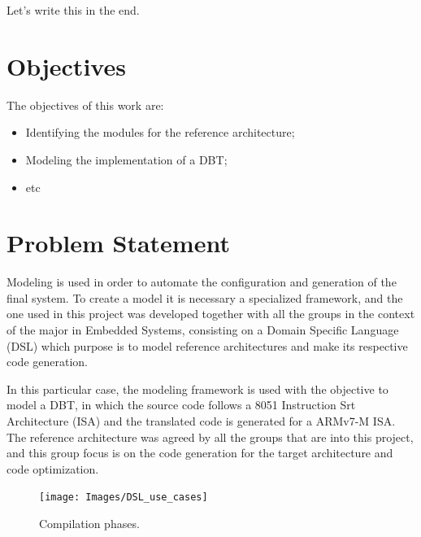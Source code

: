 \documentclass{report}
\begin{document}
	\par Let's write this in the end.

	\section{Objectives}
	
	\par The objectives of this work are:
	\begin{itemize}
		\item Identifying the modules for the reference architecture;
		\item Modeling the implementation of a DBT;
		\item etc
	\end{itemize}

	\section{Problem Statement}
	
	\par Modeling is used in order to automate the configuration and generation of the final system. To create a model it is necessary a specialized framework, and the one used in this project was developed together with all the groups in the context of the major in Embedded Systems, consisting on a Domain Specific Language (DSL) which purpose is to model reference architectures and make its respective code generation. 
	\par In this particular case, the modeling framework is used with the objective to model a DBT, in which the source code follows a 8051 Instruction Srt Architecture (ISA) and the translated code is generated for a ARMv7-M ISA.  The reference architecture was agreed by all the groups that are into this project, and this group focus is on the code generation for the target architecture and code optimization.
	
	\begin{figure} [H]
		\centering
		\texttt{[image: Images/DSL\_use\_cases]}
		\caption{Compilation phases.}
		\label{fig:compiler-sequence}
	\end{figure}
\end{document}
